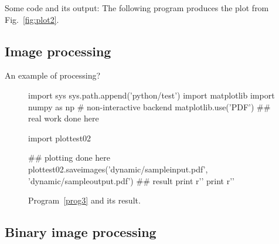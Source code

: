 Some code and its output: The following program produces the plot from Fig.~\ref{fig:plot2}.


\subsection{Image processing}
An example of processing?

\begin{figure}
\centering
\begin{python}
import sys
sys.path.append('python/test')
import matplotlib
import numpy as np
# non-interactive backend
matplotlib.use('PDF') 
## real work done here

import plottest02

## plotting done here
plottest02.saveimages('dynamic/sampleinput.pdf', 'dynamic/sampleoutput.pdf')
## result
print r''
print r''
\end{python}
\caption{Program~\ref{prog3} and its result.}
\end{figure}





\subsection{Binary image processing}

